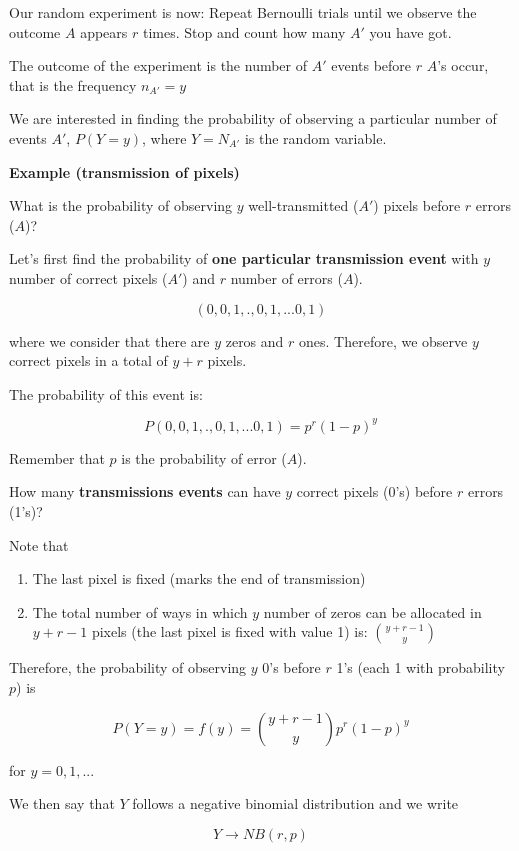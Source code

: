 \documentclass[
]{book}
\begin{document}
Our random experiment is now: Repeat Bernoulli trials until we observe the outcome \(A\) appears \(r\) times. Stop and count how many \(A'\) you have got.

The outcome of the experiment is the number of \(A'\) events before \(r\) \(A\)'s occur, that is the frequency \(n_{A'}=y\)

We are interested in finding the probability of observing a particular number of events \(A'\), \(P(Y=y)\), where \(Y=N_{A'}\) is the random variable.

\textbf{Example (transmission of pixels)}

What is the probability of observing \(y\) well-transmitted (\(A'\)) pixels before \(r\) errors (\(A\))?

Let's first find the probability of \textbf{one particular} \textbf{transmission event} with \(y\) number of correct pixels (\(A'\)) and \(r\) number of errors (\(A\)).

\[(0,0,1,., 0,1,...0,1)\]

where we consider that there are \(y\) zeros and \(r\) ones. Therefore, we observe \(y\) correct pixels in a total of \(y + r\) pixels.

The probability of this event is:

\[P(0,0,1,., 0,1,...0,1)=p^r(1-p)^y\]

Remember that \(p\) is the probability of error (\(A\)).

How many \textbf{transmissions events} can have \(y\) correct pixels (0's) before \(r\) errors (1's)?

Note that

\begin{enumerate}
\def\labelenumi{\arabic{enumi})}
\item
  The last pixel is fixed (marks the end of transmission)
\item
  The total number of ways in which \(y\) number of zeros can be allocated in \(y + r-1\) pixels (the last pixel is fixed with value 1) is: \(\binom {y + r-1} y\)
\end{enumerate}

Therefore, the probability of observing \(y\) 0's before \(r\) 1's (each 1 with probability \(p\)) is

\[P(Y=y)=f(y)=\binom {y+r-1} y p^r(1-p)^y\]

for \(y=0,1,...\)

We then say that \(Y\) follows a negative binomial distribution and we write

\[Y\rightarrow NB(r,p)\]
\end{document}
